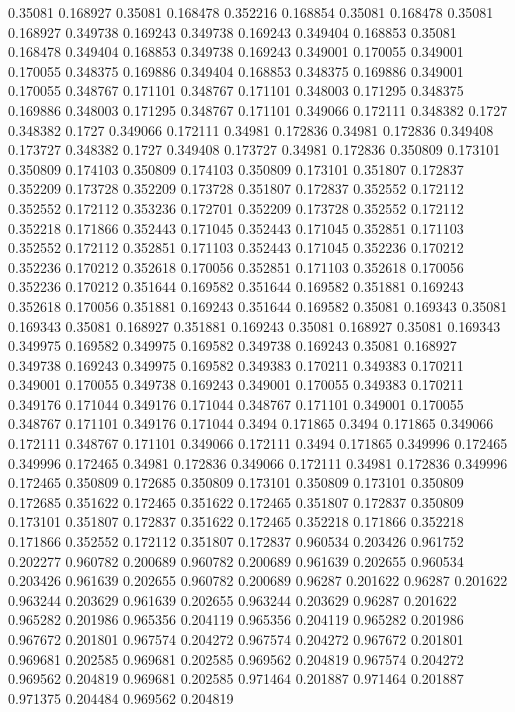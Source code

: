 0.35081 0.168927
0.35081 0.168478
0.352216 0.168854
0.35081 0.168478
0.35081 0.168927
0.349738 0.169243
0.349738 0.169243
0.349404 0.168853
0.35081 0.168478
0.349404 0.168853
0.349738 0.169243
0.349001 0.170055
0.349001 0.170055
0.348375 0.169886
0.349404 0.168853
0.348375 0.169886
0.349001 0.170055
0.348767 0.171101
0.348767 0.171101
0.348003 0.171295
0.348375 0.169886
0.348003 0.171295
0.348767 0.171101
0.349066 0.172111
0.348382 0.1727
0.348382 0.1727
0.349066 0.172111
0.34981 0.172836
0.34981 0.172836
0.349408 0.173727
0.348382 0.1727
0.349408 0.173727
0.34981 0.172836
0.350809 0.173101
0.350809 0.174103
0.350809 0.174103
0.350809 0.173101
0.351807 0.172837
0.352209 0.173728
0.352209 0.173728
0.351807 0.172837
0.352552 0.172112
0.352552 0.172112
0.353236 0.172701
0.352209 0.173728
0.352552 0.172112
0.352218 0.171866
0.352443 0.171045
0.352443 0.171045
0.352851 0.171103
0.352552 0.172112
0.352851 0.171103
0.352443 0.171045
0.352236 0.170212
0.352236 0.170212
0.352618 0.170056
0.352851 0.171103
0.352618 0.170056
0.352236 0.170212
0.351644 0.169582
0.351644 0.169582
0.351881 0.169243
0.352618 0.170056
0.351881 0.169243
0.351644 0.169582
0.35081 0.169343
0.35081 0.169343
0.35081 0.168927
0.351881 0.169243
0.35081 0.168927
0.35081 0.169343
0.349975 0.169582
0.349975 0.169582
0.349738 0.169243
0.35081 0.168927
0.349738 0.169243
0.349975 0.169582
0.349383 0.170211
0.349383 0.170211
0.349001 0.170055
0.349738 0.169243
0.349001 0.170055
0.349383 0.170211
0.349176 0.171044
0.349176 0.171044
0.348767 0.171101
0.349001 0.170055
0.348767 0.171101
0.349176 0.171044
0.3494 0.171865
0.3494 0.171865
0.349066 0.172111
0.348767 0.171101
0.349066 0.172111
0.3494 0.171865
0.349996 0.172465
0.349996 0.172465
0.34981 0.172836
0.349066 0.172111
0.34981 0.172836
0.349996 0.172465
0.350809 0.172685
0.350809 0.173101
0.350809 0.173101
0.350809 0.172685
0.351622 0.172465
0.351622 0.172465
0.351807 0.172837
0.350809 0.173101
0.351807 0.172837
0.351622 0.172465
0.352218 0.171866
0.352218 0.171866
0.352552 0.172112
0.351807 0.172837
0.960534 0.203426
0.961752 0.202277
0.960782 0.200689
0.960782 0.200689
0.961639 0.202655
0.960534 0.203426
0.961639 0.202655
0.960782 0.200689
0.96287 0.201622
0.96287 0.201622
0.963244 0.203629
0.961639 0.202655
0.963244 0.203629
0.96287 0.201622
0.965282 0.201986
0.965356 0.204119
0.965356 0.204119
0.965282 0.201986
0.967672 0.201801
0.967574 0.204272
0.967574 0.204272
0.967672 0.201801
0.969681 0.202585
0.969681 0.202585
0.969562 0.204819
0.967574 0.204272
0.969562 0.204819
0.969681 0.202585
0.971464 0.201887
0.971464 0.201887
0.971375 0.204484
0.969562 0.204819
